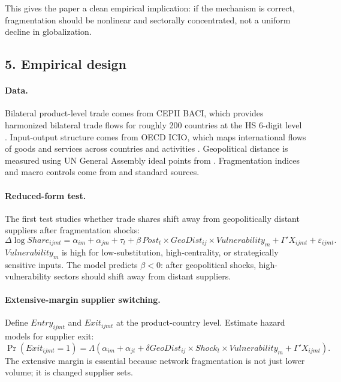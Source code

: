 \documentclass[11pt]{article}
\begin{document}
This gives the paper a clean empirical implication: if the mechanism is correct, fragmentation should be nonlinear and sectorally concentrated, not a uniform decline in globalization.

\subsection*{5. Empirical design}
\paragraph{Data.} Bilateral product-level trade comes from CEPII BACI, which provides harmonized bilateral trade flows for roughly 200 countries at the HS 6-digit level \citep{CEPIIBACI}. Input-output structure comes from OECD ICIO, which maps international flows of goods and services across countries and activities \citep{OECDICIO}. Geopolitical distance is measured using UN General Assembly ideal points from \citet{BaileyStrezhnevVoeten2017}. Fragmentation indices and macro controls come from \citet{FernandezVillaverdeMineyamaSong2024} and standard sources.

\paragraph{Reduced-form test.} The first test studies whether trade shares shift away from geopolitically distant suppliers after fragmentation shocks:
\begin{equation}
\Delta \log Share_{ijmt}=\alpha_{im}+\alpha_{jm}+\tau_t+\beta\,Post_t\times GeoDist_{ij}\times Vulnerability_m+\Gamma'X_{ijmt}+\varepsilon_{ijmt}. \label{eq:trade-did}
\end{equation}
$Vulnerability_m$ is high for low-substitution, high-centrality, or strategically sensitive inputs. The model predicts $\beta<0$: after geopolitical shocks, high-vulnerability sectors should shift away from distant suppliers.

\paragraph{Extensive-margin supplier switching.} Define $Entry_{ijmt}$ and $Exit_{ijmt}$ at the product-country level. Estimate hazard models for supplier exit:
\begin{equation}
\Pr(Exit_{ijmt}=1)=\Lambda\left(\alpha_{im}+\alpha_{jt}+\delta GeoDist_{ij}\times Shock_t\times Vulnerability_m+\Gamma'X_{ijmt}\right). \label{eq:exit}
\end{equation}
The extensive margin is essential because network fragmentation is not just lower volume; it is changed supplier sets.
\end{document}
